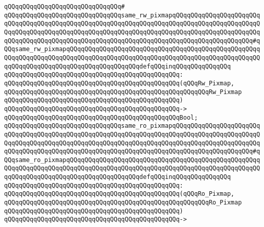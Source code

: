 \verb|qQQqqQQqqQQqqQQqqQQqqQQqqQQqqQQq#|\newline
\verb|qQQqqQQqqQQqqQQqqQQqqQQqqQQqqQQqsame_rw_pixmapqQQqqQQqqQQqqQQqqQQqqQQqqQQqqQQqqQQqqQQqqQQqqQQqqQQqqQQqqQQqqQQqqQQqqQQqqQQqqQQqqQQqqQQqqQQqqQQqqQQqqQQqqQQqqQQqqQQqqQQqqQQqqQQqqQQqqQQqqQQqqQQqqQQqqQQqqQQqqQQqqQQqqQQqqQQqqQQqqQQqqQQqqQQqqQQqqQQqqQQqqQQqqQQqqQQqqQQqqQQqqQQqqQQqqQQq#qQQqsame_rw_pixmapqQQqqQQqqQQqqQQqqQQqqQQqqQQqqQQqqQQqqQQqqQQqqQQqqQQqqQQqqQQqqQQqqQQqqQQqqQQqqQQqqQQqqQQqqQQqqQQqqQQqqQQqqQQqqQQqqQQqqQQqqQQqqQQqqQQqqQQqqQQqqQQqqQQqqQQqqQQqqQQqdefqQQqinqQQqqQQqqQQqqQQq|\newline
\verb|qQQqqQQqqQQqqQQqqQQqqQQqqQQqqQQqqQQqqQQqqQQqqQQq:|\newline
\verb|qQQqqQQqqQQqqQQqqQQqqQQqqQQqqQQqqQQqqQQqqQQqqQQq(qQQqRw_Pixmap,|\newline
\verb|qQQqqQQqqQQqqQQqqQQqqQQqqQQqqQQqqQQqqQQqqQQqqQQqqQQqqQQqRw_Pixmap|\newline
\verb|qQQqqQQqqQQqqQQqqQQqqQQqqQQqqQQqqQQqqQQqqQQqqQQq)|\newline
\verb|qQQqqQQqqQQqqQQqqQQqqQQqqQQqqQQqqQQqqQQqqQQqqQQq->|\newline
\verb|qQQqqQQqqQQqqQQqqQQqqQQqqQQqqQQqqQQqqQQqqQQqqQQqBool;|\newline
\newline
\verb|qQQqqQQqqQQqqQQqqQQqqQQqqQQqqQQqsame_ro_pixmapqQQqqQQqqQQqqQQqqQQqqQQqqQQqqQQqqQQqqQQqqQQqqQQqqQQqqQQqqQQqqQQqqQQqqQQqqQQqqQQqqQQqqQQqqQQqqQQqqQQqqQQqqQQqqQQqqQQqqQQqqQQqqQQqqQQqqQQqqQQqqQQqqQQqqQQqqQQqqQQqqQQqqQQqqQQqqQQqqQQqqQQqqQQqqQQqqQQqqQQqqQQqqQQqqQQqqQQqqQQqqQQqqQQqqQQq#qQQqsame_ro_pixmapqQQqqQQqqQQqqQQqqQQqqQQqqQQqqQQqqQQqqQQqqQQqqQQqqQQqqQQqqQQqqQQqqQQqqQQqqQQqqQQqqQQqqQQqqQQqqQQqqQQqqQQqqQQqqQQqqQQqqQQqqQQqqQQqqQQqqQQqqQQqqQQqqQQqqQQqqQQqqQQqdefqQQqinqQQqqQQqqQQqqQQq|\newline
\verb|qQQqqQQqqQQqqQQqqQQqqQQqqQQqqQQqqQQqqQQqqQQqqQQq:|\newline
\verb|qQQqqQQqqQQqqQQqqQQqqQQqqQQqqQQqqQQqqQQqqQQqqQQq(qQQqRo_Pixmap,|\newline
\verb|qQQqqQQqqQQqqQQqqQQqqQQqqQQqqQQqqQQqqQQqqQQqqQQqqQQqqQQqRo_Pixmap|\newline
\verb|qQQqqQQqqQQqqQQqqQQqqQQqqQQqqQQqqQQqqQQqqQQqqQQq)|\newline
\verb|qQQqqQQqqQQqqQQqqQQqqQQqqQQqqQQqqQQqqQQqqQQqqQQq->|\newline
